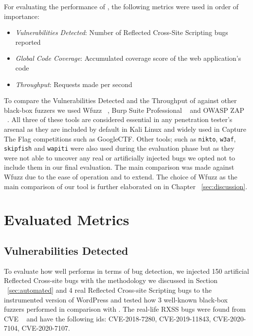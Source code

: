 For evaluating the performance of \pname{}, the following metrics were used in order of importance:
\begin{itemize}
	\item \emph{Vulnerabilities Detected}: Number of Reflected Cross-Site Scripting bugs reported
	\item \emph{Global Code Coverage}: Accumulated coverage score of the web application's code
	\item \emph{Throughput}: Requests made per second
\end{itemize}

To compare the Vulnerabilities Detected and the Throughput of \pname{} against other black-box fuzzers we used Wfuzz ~\cite{wfuzz}, Burp Suite Professional ~\cite{burp} and OWASP ZAP ~\cite{ owaspzap}. All three of these tools are considered essential in any penetration tester's arsenal as they are included by default in Kali Linux and widely used in Capture The Flag competitions such as GoogleCTF. Other tools; such as {\tt nikto}, {\tt w3af}, {\tt skipfish} and {\tt wapiti} were also used during the evaluation phase but as they were not able to uncover any real or artificially injected bugs we opted not to include them in our final evaluation. The main comparison was made against Wfuzz due to the ease of operation and to extend. The choice of Wfuzz as the main comparison of our tool is further elaborated on in Chapter ~\ref{sec:discussion}.

\section{Evaluated Metrics}

\subsection{Vulnerabilities Detected}
To evaluate how well \pname{} performs in terms of bug detection, we injected 150 artificial  Reflected Cross-site bugs with the methodology we discussed in Section ~\ref{sec:automated} and 4 real Reflected Cross-site Scripting bugs to the instrumented version of WordPress and tested how 3 well-known black-box fuzzers performed in comparison with \pname{}. The real-life RXSS bugs were found from CVE ~\cite{cve} and have the following ids: CVE-2018-7280, CVE-2019-11843, CVE-2020-7104, CVE-2020-7107.

